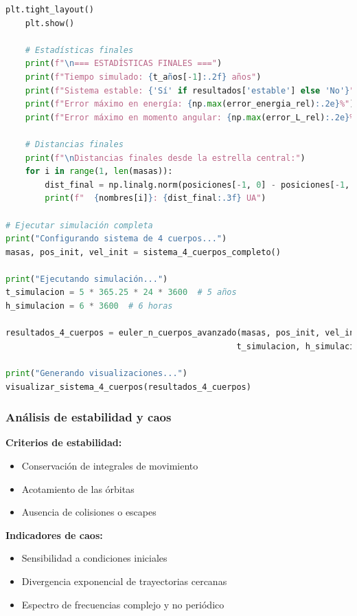 \documentclass{article}
\begin{document}
\begin{lstlisting}[language=Python, caption={Sistema completo de 4 cuerpos con análisis dinámico}]
    plt.tight_layout()
    plt.show()
    
    # Estadísticas finales
    print(f"\n=== ESTADÍSTICAS FINALES ===")
    print(f"Tiempo simulado: {t_años[-1]:.2f} años")
    print(f"Sistema estable: {'Sí' if resultados['estable'] else 'No'}")
    print(f"Error máximo en energía: {np.max(error_energia_rel):.2e}%")
    print(f"Error máximo en momento angular: {np.max(error_L_rel):.2e}%")
    
    # Distancias finales
    print(f"\nDistancias finales desde la estrella central:")
    for i in range(1, len(masas)):
        dist_final = np.linalg.norm(posiciones[-1, 0] - posiciones[-1, i]) / UA
        print(f"  {nombres[i]}: {dist_final:.3f} UA")

# Ejecutar simulación completa
print("Configurando sistema de 4 cuerpos...")
masas, pos_init, vel_init = sistema_4_cuerpos_completo()

print("Ejecutando simulación...")
t_simulacion = 5 * 365.25 * 24 * 3600  # 5 años
h_simulacion = 6 * 3600  # 6 horas

resultados_4_cuerpos = euler_n_cuerpos_avanzado(masas, pos_init, vel_init, 
                                               t_simulacion, h_simulacion)

print("Generando visualizaciones...")
visualizar_sistema_4_cuerpos(resultados_4_cuerpos)
	\end{lstlisting}

	\subsubsection{Análisis de estabilidad y caos}
	
	\textbf{Criterios de estabilidad:}
	\begin{itemize}
	\item Conservación de integrales de movimiento
	\item Acotamiento de las órbitas
	\item Ausencia de colisiones o escapes
	\end{itemize}
	
	\textbf{Indicadores de caos:}
	\begin{itemize}
	\item Sensibilidad a condiciones iniciales
	\item Divergencia exponencial de trayectorias cercanas
	\item Espectro de frecuencias complejo y no periódico
	\end{itemize}
\end{document}
